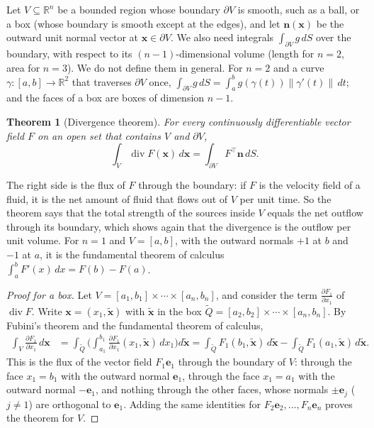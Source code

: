 \documentclass[11pt]{article}
\newcommand{\norm}[1]{\lVert #1 \rVert}
\theoremstyle{definition}
\theoremstyle{plain}
\newtheorem{theorem}[definition]{Theorem}
\theoremstyle{remark}
\DeclareMathOperator{\Div}{div}
\begin{document}
Let $V \subseteq \mathbb{R}^n$ be a bounded region whose boundary $\partial V$ is smooth, such as a ball, or a box (whose boundary is smooth except at the edges), and let $\mathbf{n}(\mathbf{x})$ be the outward unit normal vector at $\mathbf{x} \in \partial V$. We also need integrals $\int_{\partial V} g\, dS$ over the boundary, with respect to its $(n-1)$-dimensional volume (length for $n = 2$, area for $n = 3$). We do not define them in general. For $n = 2$ and a curve $\gamma: [a, b] \to \mathbb{R}^2$ that traverses $\partial V$ once, $\int_{\partial V} g\, dS = \int_a^b g(\gamma(t))\norm{\gamma'(t)}\, dt$; and the faces of a box are boxes of dimension $n - 1$.

\begin{theorem}[Divergence theorem]\label{thm:divergence}
    For every continuously differentiable vector field $F$ on an open set that contains $V$ and $\partial V$,
    \[\int_V \Div F(\mathbf{x})\, d\mathbf{x} = \int_{\partial V} F^\top\mathbf{n}\, dS.\]
\end{theorem}

The right side is the flux of $F$ through the boundary: if $F$ is the velocity field of a fluid, it is the net amount of fluid that flows out of $V$ per unit time. So the theorem says that the total strength of the sources inside $V$ equals the net outflow through its boundary, which shows again that the divergence is the outflow per unit volume. For $n = 1$ and $V = [a, b]$, with the outward normals $+1$ at $b$ and $-1$ at $a$, it is the fundamental theorem of calculus $\int_a^b F'(x)\, dx = F(b) - F(a)$.

\begin{proof}[Proof for a box]
    Let $V = [a_1, b_1] \times \cdots \times [a_n, b_n]$, and consider the term $\frac{\partial F_1}{\partial x_1}$ of $\Div F$. Write $\mathbf{x} = (x_1, \tilde{\mathbf{x}})$ with $\tilde{\mathbf{x}}$ in the box $\tilde Q = [a_2, b_2] \times \cdots \times [a_n, b_n]$. By Fubini's theorem and the fundamental theorem of calculus,
    \begin{align*}
        \int_V \frac{\partial F_1}{\partial x_1}\, d\mathbf{x} &= \int_{\tilde Q}\bigg(\int_{a_1}^{b_1}\frac{\partial F_1}{\partial x_1}(x_1, \tilde{\mathbf{x}})\, dx_1\bigg) d\tilde{\mathbf{x}} = \int_{\tilde Q} F_1(b_1, \tilde{\mathbf{x}})\, d\tilde{\mathbf{x}} - \int_{\tilde Q} F_1(a_1, \tilde{\mathbf{x}})\, d\tilde{\mathbf{x}}.
    \end{align*}
    This is the flux of the vector field $F_1\mathbf{e}_1$ through the boundary of $V$: through the face $x_1 = b_1$ with the outward normal $\mathbf{e}_1$, through the face $x_1 = a_1$ with the outward normal $-\mathbf{e}_1$, and nothing through the other faces, whose normals $\pm\mathbf{e}_j$ ($j \neq 1$) are orthogonal to $\mathbf{e}_1$. Adding the same identities for $F_2\mathbf{e}_2, \ldots, F_n\mathbf{e}_n$ proves the theorem for $V$.
\end{proof}
\end{document}
